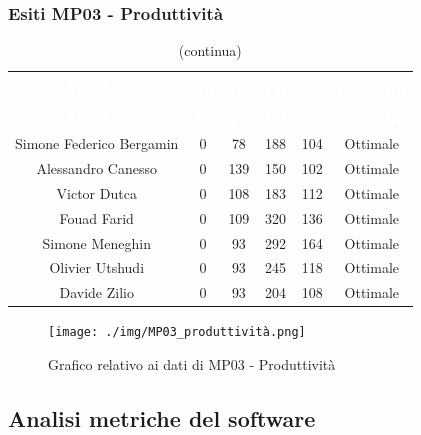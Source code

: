 \subsubsection{Esiti MP03 - Produttività} 
\begin{longtable}{c c c c c c}
\rowcolor{white}\caption{Esiti MP03 - Produttività} \\
		\rowcolor{redafk}
\textcolor{white}{\textbf{Membro}} &
\textcolor{white}{\textbf{An}} &
\textcolor{white}{\textbf{TB}} &
\textcolor{white}{\textbf{PB}} &
\textcolor{white}{\textbf{VC}} &
\textcolor{white}{\textbf{Riscontro}} \\
		\endfirsthead
		\rowcolor{white}\caption[]{(continua)} \\
		\rowcolor{redafk}
		\textcolor{white}{\textbf{Membro}} &
\textcolor{white}{\textbf{An}} &
\textcolor{white}{\textbf{TB}} &
\textcolor{white}{\textbf{PB}} &
\textcolor{white}{\textbf{VC}} &
\textcolor{white}{\textbf{Riscontro}} \\
		\endhead
Simone Federico Bergamin & 0 & 78 & 188 & 104 & Ottimale\\
Alessandro Canesso & 0 & 139 & 150 & 102 & Ottimale \\
Victor Dutca & 0 & 108 & 183 & 112 & Ottimale \\
Fouad Farid & 0 & 109 & 320 & 136 & Ottimale \\
Simone Meneghin & 0 & 93 & 292 & 164 & Ottimale\\
Olivier Utshudi & 0 & 93 & 245 & 118 & Ottimale\\
Davide Zilio & 0 & 93 & 204 & 108 & Ottimale\\
\end{longtable}

\begin{figure}[H]
\centering
\texttt{[image: ./img/MP03\_produttività.png]}
\caption{Grafico relativo ai dati di MP03 - Produttività}
\end{figure}

\subsection{Analisi metriche del software}
